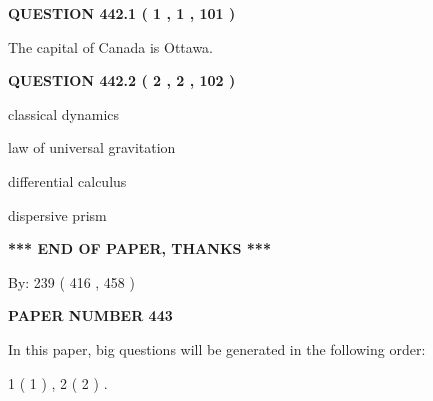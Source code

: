 \documentclass[12pt]{article}
\begin{document}
{\textbf{\Large{QUESTION
442.1 
 ( 1 , 1 , 101 )
}}}
  
  
 
 
\noindent{}
 
 
The capital of Canada is Ottawa.
 
 
 
 
  
\vspace{0.2in}
  
{\textbf{\Large{QUESTION
442.2 
 ( 2 , 2 , 102 )
}}}
  
  
 
 
\noindent{}
 
 
classical dynamics
 
 
law of universal gravitation
 
 
differential calculus
 
 
dispersive prism
 
 
 
 
   
   
\vspace{1.0in} 
{\textbf{\large{ *** END OF PAPER, THANKS *** }}} 
   
   
\hspace{1.0in} By: 
 239 ( 416 ,  458 )
   
   
   
   
\newpage 
\setcounter{page}{ 
   443001 } 
   
   
   
   
 {\textbf{ \Large{ PAPER NUMBER  443  }}}
   
   
\vspace{0.2in}
   
   
   
   
   
\vspace{0.2in}
   
In this paper, big questions will be generated in the following order: 
   
   
   1 ( 1 )
 ,
   2 ( 2 )
 .
  
\vspace{0.2in}
  
\end{document}
